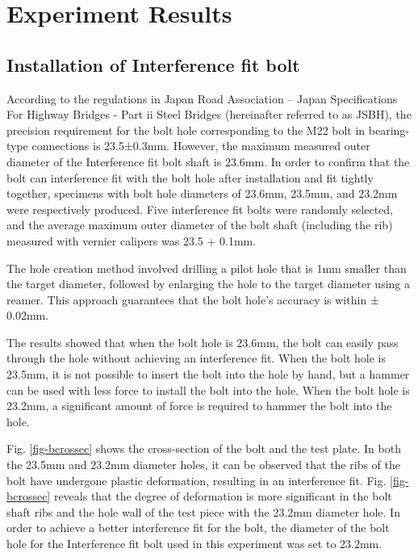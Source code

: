 \section{Experiment Results}

\subsection{Installation of Interference fit bolt}
According to the regulations in Japan Road Association -- Japan Specifications For Highway Bridges - Part ii Steel Bridges\cite{douji2017} (hereinafter referred to as JSBH), the precision requirement for the bolt hole corresponding to the M22 bolt in bearing-type connections is 23.5±0.3mm. However, the maximum measured outer diameter of the Interference fit bolt shaft is 23.6mm. In order to confirm that the bolt can interference fit with the bolt hole after installation and fit tightly together, specimens with bolt hole diameters of 23.6mm, 23.5mm, and 23.2mm were respectively produced. Five interference fit bolts were randomly selected, and the average maximum  outer diameter of the bolt shaft (including the rib) measured with vernier calipers was 23.5 + 0.1mm.

The hole creation method involved drilling a pilot hole that is 1mm smaller than the target diameter, followed by enlarging the hole to the target diameter using a reamer. This approach guarantees that the bolt hole's accuracy is within ± 0.02mm.

The results showed that when the bolt hole is 23.6mm, the bolt can easily pass through the hole without achieving an interference fit. When the bolt hole is 23.5mm, it is not possible to insert the bolt into the hole by hand, but a hammer can be used with less force to install the bolt into the hole. When the bolt hole is 23.2mm, a significant amount of force is required to hammer the bolt into the hole.

Fig. \ref{fig-bcrossec} shows the cross-section of the bolt and the test plate. In both the 23.5mm and 23.2mm diameter holes, it can be observed that the ribs of the bolt have undergone plastic deformation, resulting in an interference fit. Fig. \ref{fig-bcrossec} reveals that the degree of deformation is more significant in the bolt shaft ribs and the hole wall of the test piece with the 23.2mm diameter hole. In order to achieve a better interference fit for the bolt, the diameter of the bolt hole for the Interference fit bolt used in this experiment was set to 23.2mm.


